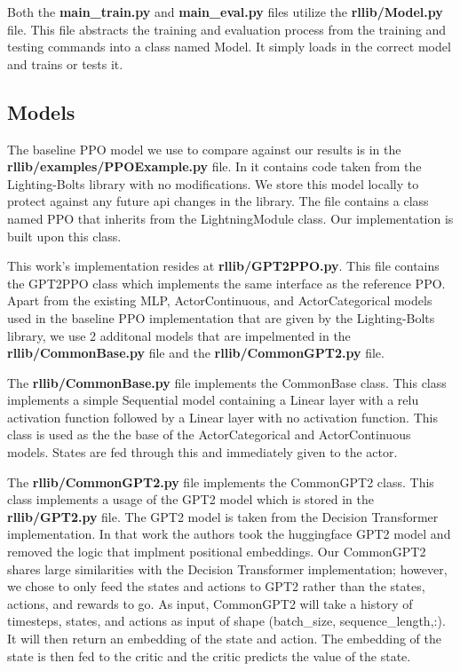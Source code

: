 Both the \textbf{main\_train.py} and \textbf{main\_eval.py} files utilize the \textbf{rllib/Model.py} file.
This file abstracts the training and evaluation process from the training and testing commands into a class named Model.
It simply loads in the correct model and trains or tests it.

\subsection{Models}

The baseline PPO model we use to compare against our results is in the \textbf{rllib/examples/PPOExample.py} file. In it contains code taken from the Lighting-Bolts library with no modifications. We store this model locally to protect against any future api changes in the library. The file contains a class named PPO that inherits from the LightningModule class. Our implementation is built upon this class.

This work's implementation resides at \textbf{rllib/GPT2PPO.py}. This file contains the GPT2PPO class which implements the same interface as the reference PPO. Apart from the existing MLP, ActorContinuous, and ActorCategorical models used in the baseline PPO implementation that are given by the Lighting-Bolts library, we use 2 additonal models that are impelmented in the \textbf{rllib/CommonBase.py} file and the \textbf{rllib/CommonGPT2.py} file.

The \textbf{rllib/CommonBase.py} file implements the CommonBase class. This class implements a simple Sequential model containing a Linear layer with a relu activation function followed by a Linear layer with no activation function. This class is used as the the base of the ActorCategorical and ActorContinuous models. States are fed through this and immediately given to the actor.

The \textbf{rllib/CommonGPT2.py} file implements the CommonGPT2 class. This class implements a usage of the GPT2 model which is stored in the \textbf{rllib/GPT2.py} file. The GPT2 model is taken from the Decision Transformer implementation\cite{chen2021decision}. In that work the authors took the huggingface GPT2 model and removed the logic that implment positional embeddings\cite{radford2019language,wolf2019huggingface}. Our CommonGPT2 shares large similarities with the Decision Transformer implementation\cite{chen2021decision}; however, we chose to only feed the states and actions to GPT2 rather than the states, actions, and rewards to go. As input, CommonGPT2 will take a history of timesteps, states, and actions as input of shape (batch\_size, sequence\_length,:). It will then return an embedding of the state and action. The embedding of the state is then fed to the critic and the critic predicts the value of the state.

